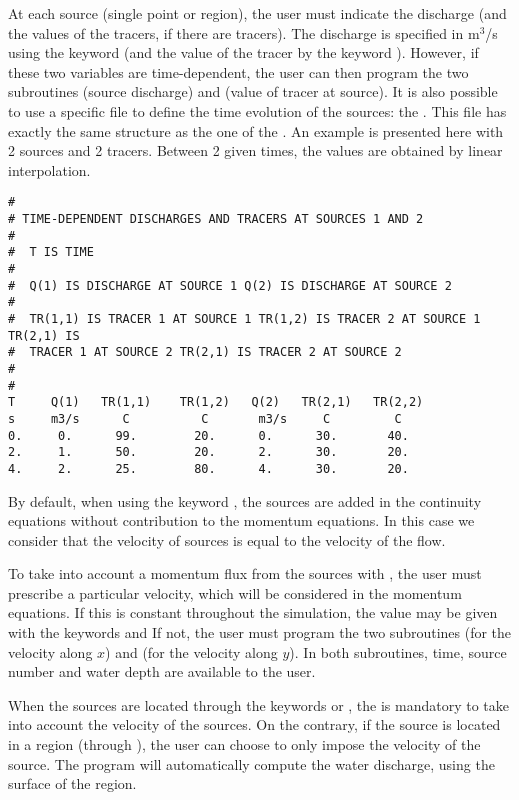 At each source (single point or region), the user must indicate the discharge
(and the values of the tracers, if there are tracers).
The discharge is specified in m${}^{3}$/s using
the keyword  (and the value of the tracer by
the keyword ). However, if these
two variables are time-dependent, the user can then program the two subroutines
 (source discharge) and  (value of
tracer at source). It is also possible to use a specific file to define the time
evolution of the sources:
the . This file has exactly the same
structure as the one of the .
An example is presented here with 2 sources and 2 tracers.
Between 2 given times, the values are obtained by linear interpolation.
\begin{lstlisting}[language=TelemacCas]
#
# TIME-DEPENDENT DISCHARGES AND TRACERS AT SOURCES 1 AND 2
#
#  T IS TIME
#
#  Q(1) IS DISCHARGE AT SOURCE 1 Q(2) IS DISCHARGE AT SOURCE 2
#
#  TR(1,1) IS TRACER 1 AT SOURCE 1 TR(1,2) IS TRACER 2 AT SOURCE 1 TR(2,1) IS
#  TRACER 1 AT SOURCE 2 TR(2,1) IS TRACER 2 AT SOURCE 2
#
#
T     Q(1)   TR(1,1)    TR(1,2)   Q(2)   TR(2,1)   TR(2,2)
s     m3/s      C          C       m3/s     C         C
0.     0.      99.        20.      0.      30.       40.
2.     1.      50.        20.      2.      30.       20.
4.     2.      25.        80.      4.      30.       20.
\end{lstlisting}
By default, when using the keyword , the
sources are added in the continuity equations without contribution to the
momentum equations. In this case we consider that the velocity of sources is
equal to the velocity of the flow.

To take into account a momentum flux from the sources with , the
user must prescribe a particular velocity, which will be considered in the
momentum equations. If this is constant throughout the simulation, the value
may be given with the keywords  and
 If not, the user must program the
two subroutines  (for the velocity along $x$) and
 (for the velocity along $y$).
In both subroutines, time, source number and water depth are available to the
user.

When the sources are located through the keywords 
or , the
is mandatory to take into account the velocity of the sources.
On the contrary, if the source is located in a region (through
), the user can choose
to only impose the velocity of the source.
The program will automatically compute the water discharge, using the surface
of the region.

